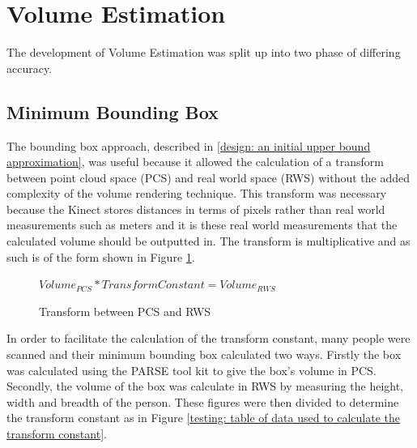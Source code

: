 \section{Volume Estimation}
\label{volume estimation}
The development of Volume Estimation was split up into two phase of differing accuracy.
\subsection{Minimum Bounding Box}
\label{testing: minimum bounding box}
The bounding box approach, described in \ref{design: an initial upper bound approximation}, was useful because it allowed the calculation of a transform between point cloud space (PCS) and real world space (RWS) without the added complexity of the volume rendering technique. This transform was necessary because the Kinect stores distances in terms of pixels rather than real world measurements such as meters and it is these real world measurements that the calculated volume should be outputted in. The transform is multiplicative and as such is of the form shown in Figure \ref{testing: transform between pcs and rws}.\\

\begin{figure}[h]
\begin{center}
$Volume_{PCS} * Transform Constant = Volume_{RWS}$
\end{center}
\caption{Transform between PCS and RWS}
\label{testing: transform between pcs and rws}
\end{figure}

In order to facilitate the calculation of the transform constant, many people were scanned and their minimum bounding box calculated two ways. Firstly the box was calculated using the PARSE tool kit to give the box's volume in PCS. Secondly, the volume of the box was calculate in RWS by measuring the height, width and breadth of the person. These figures were then divided to determine the transform constant as in Figure \ref{testing: table of data used to calculate the transform constant}.\\

